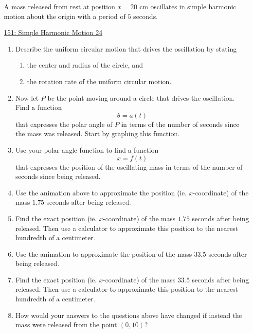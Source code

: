 \documentclass{ximera}
\begin{document}
\begin{example} \label{ExODferre3}
A mass released from rest at position $x=20$ cm oscillates in simple harmonic motion about the origin with a period of $5$ seconds.

\begin{onlineOnly}
    \begin{center}
\end{center}
\end{onlineOnly}

\href{https://www.desmos.com/calculator/dcbahunfxq5fuz}{151: Simple Harmonic Motion 24}

\begin{enumerate}

\item Describe the uniform circular motion that drives the oscillation by stating
\begin{enumerate}
\item the center and radius of the circle, and

\item the rotation rate of the uniform circular motion. 
\end{enumerate}


\item Now let $P$ be the point moving around a circle that drives the oscillation. Find a function
\[
    \theta = a(t)
\]
that expresses the polar angle of $P$ in terms of the number of seconds since the mass was released. Start by graphing this function. 

\item Use your polar angle function to find a function 
\[
   x= f(t)
\]
that expresses the position of the oscillating mass in terms of the number of seconds since being released.

\item Use the animation above to approximate  the position (ie. $x$-coordinate) of the mass $1.75$ seconds after being released.

\item Find the exact position (ie. $x$-coordinate) of the mass $1.75$ seconds after being released. Then use a calculator to approximate this position to the nearest hundredth of a centimeter.

\item Use the animation to approximate the position of the mass $33.5$ seconds after being released. 

\item Find the exact position (ie. $x$-coordinate) of the mass $33.5$ seconds after being released. Then use a calculator to approximate this position to the nearest hundredth of a centimeter.

\item How would your answers to the questions above have changed if instead the mass were released from the point $(0,10)$?

\end{enumerate}

\end{example}
\end{document}
